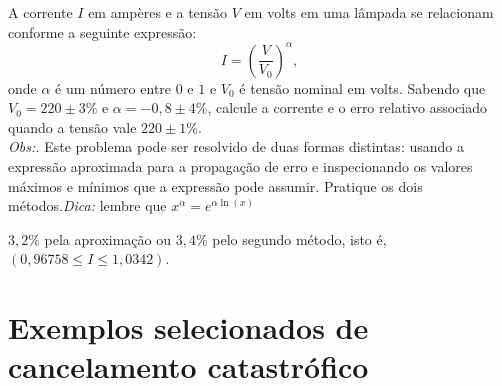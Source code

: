 \begin{exer} A corrente $I$ em ampères e a tensão $V$ em volts em uma lâmpada se relacionam conforme a seguinte expressão:
  \begin{equation}
    I=\left(\frac{V}{V_0}\right)^\alpha,
  \end{equation}
onde $\alpha$ é um número entre $0$ e $1$ e $V_0$ é tensão nominal em volts. Sabendo que $V_0=220\pm 3\%$ e $\alpha=-0,8\pm 4\%$, calcule a corrente e o erro relativo associado quando a tensão vale $220\pm 1\%$.\\
\emph{Obs:.} Este problema pode ser resolvido de duas formas distintas: usando a expressão aproximada para a propagação de erro e inspecionando os valores máximos e mínimos que a expressão pode assumir. Pratique os dois métodos.\emph{Dica:} lembre que $x^\alpha=e^{\alpha \ln(x)}$
\end{exer}
\begin{resp}
  $3,2\%$ pela aproximação ou $3,4\%$ pelo segundo método, isto é, $\left(0,96758 \leq I\leq 1,0342\right)$.
\end{resp}




\section{Exemplos selecionados de cancelamento catastrófico}

